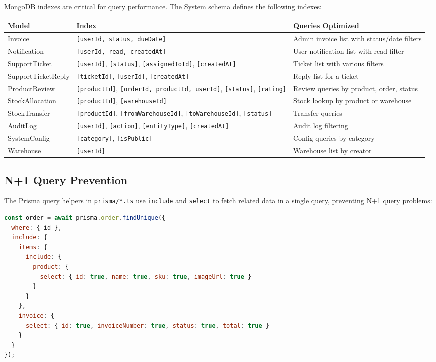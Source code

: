 \documentclass[12pt,a4paper]{report}
\begin{document}
MongoDB indexes are critical for query performance. The System schema defines the following indexes:

\begin{center}
\begin{longtable}{llp{6cm}}
  \toprule
  \textbf{Model} & \textbf{Index} & \textbf{Queries Optimized} \\
  \midrule
  \endhead
  Invoice        & \texttt{[userId, status, dueDate]} & Admin invoice list with status/date filters \\
  Notification   & \texttt{[userId, read, createdAt]} & User notification list with read filter \\
  SupportTicket  & \texttt{[userId]}, \texttt{[status]}, \texttt{[assignedToId]}, \texttt{[createdAt]} & Ticket list with various filters \\
  SupportTicketReply & \texttt{[ticketId]}, \texttt{[userId]}, \texttt{[createdAt]} & Reply list for a ticket \\
  ProductReview  & \texttt{[productId]}, \texttt{[orderId, productId, userId]}, \texttt{[status]}, \texttt{[rating]} & Review queries by product, order, status \\
  StockAllocation & \texttt{[productId]}, \texttt{[warehouseId]} & Stock lookup by product or warehouse \\
  StockTransfer  & \texttt{[productId]}, \texttt{[fromWarehouseId]}, \texttt{[toWarehouseId]}, \texttt{[status]} & Transfer queries \\
  AuditLog       & \texttt{[userId]}, \texttt{[action]}, \texttt{[entityType]}, \texttt{[createdAt]} & Audit log filtering \\
  SystemConfig   & \texttt{[category]}, \texttt{[isPublic]} & Config queries by category \\
  Warehouse      & \texttt{[userId]} & Warehouse list by creator \\
  \bottomrule
\end{longtable}
\end{center}

\subsection{N+1 Query Prevention}

The Prisma query helpers in \texttt{prisma/*.ts} use \texttt{include} and \texttt{select} to fetch related data in a single query, preventing N+1 query problems:

\begin{lstlisting}[language=JavaScript,caption={Efficient order query with includes}]
const order = await prisma.order.findUnique({
  where: { id },
  include: {
    items: {
      include: {
        product: {
          select: { id: true, name: true, sku: true, imageUrl: true }
        }
      }
    },
    invoice: {
      select: { id: true, invoiceNumber: true, status: true, total: true }
    }
  }
});
\end{lstlisting}
\end{document}
